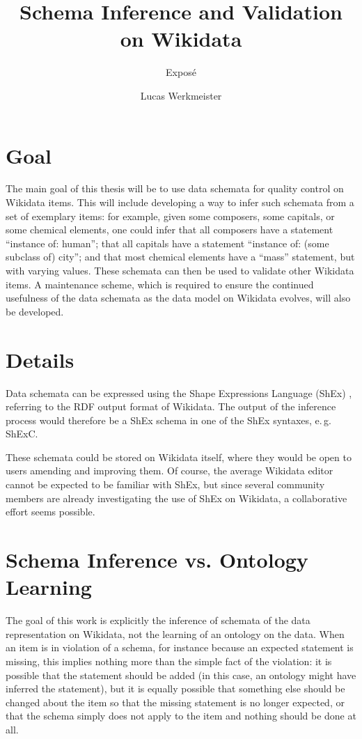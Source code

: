 \documentclass{scrartcl}
\title{Schema Inference and Validation on Wikidata}
\subtitle{Exposé}
\author{Lucas Werkmeister}
\begin{document}
\maketitle

\section{Goal}

The main goal of this thesis will be to use data schemata for quality control on Wikidata items.
This will include developing a way to infer such schemata from a set of exemplary items:
for example, given some composers, some capitals, or some chemical elements,
one could infer that all composers have a statement “instance of: human”;
that all capitals have a statement “instance of: (some subclass of) city”;
and that most chemical elements have a “mass” statement, but with varying values.
These schemata can then be used to validate other Wikidata items.
A maintenance scheme,
which is required to ensure the continued usefulness of the data schemata
as the data model on Wikidata evolves,
will also be developed.

\section{Details}

Data schemata can be expressed using the Shape Expressions Language (ShEx) \cite{Prud'hommeaux:2014:SER:2660517.2660523},
referring to the RDF output format of Wikidata.
The output of the inference process would therefore be a ShEx schema in one of the ShEx syntaxes, e.\,g. ShExC.

These schemata could be stored on Wikidata itself,
where they would be open to users amending and improving them.
Of course, the average Wikidata editor cannot be expected to be familiar with ShEx,
but since several community members are already investigating the use of ShEx on Wikidata,
a collaborative effort seems possible.

\section{Schema Inference vs. Ontology Learning}

The goal of this work is explicitly the inference of schemata of the data representation on Wikidata,
not the learning of an ontology on the data.
When an item is in violation of a schema,
for instance because an expected statement is missing,
this implies nothing more than the simple fact of the violation:
it is possible that the statement should be added
(in this case, an ontology might have inferred the statement),
but it is equally possible that something else should be changed about the item so that the missing statement is no longer expected,
or that the schema simply does not apply to the item and nothing should be done at all.
\end{document}
